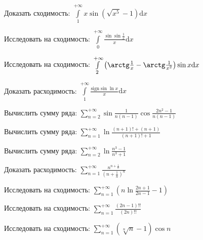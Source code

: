 \documentclass[russian]{article}
\newcommand{\dx}{\text{d}x}
\begin{document}
Доказать сходимость:
$\int\limits_1^{+\infty} x \sin (\sqrt{x^5} - 1) \dx$

Исследовать на сходимость:
$\int\limits_0^{+\infty} \frac{\sin \sin \frac{1}{x}}{x} \dx$

Исследовать на сходимость:
$\int\limits_2^{+\infty} \left( \arctg \frac{1}{x} - \arctg \frac{1}{x^2} \right) \sin x \dx$

Доказать расходимость:
$\int\limits_1^{+\infty} \frac{\text{sign} \sin \ln x}{x} \dx$


Вычислить сумму ряда:
$\sum\limits_{n = 2}^{+\infty} \sin \frac{1}{n(n-1)} \cos \frac{2n^2 - 1}{n(n - 1)}$

Вычислить сумму ряда:
$\sum\limits_{n = 1}^{+\infty}  \ln \frac{(n + 1)! + (n + 1)}{(n + 1)! + 1}$

Вычислить сумму ряда:
$\sum\limits_{n = 2}^{+\infty}  \ln \frac{n^3 - 1}{n^3 + 1}$


Доказать расходимость:
$\sum\limits_{n = 1}^{+\infty} \frac{n^{n + \frac{1}{n}}}{\left(n + \frac{1}{n}\right)^n}$

Исследовать на сходимость:
$\sum\limits_{n = 1}^{+\infty} \left(n\ln\frac{2n + 1}{2n - 1} - 1\right)$

Исследовать на сходимость:
$\sum\limits_{n = 1}^{+\infty} \frac{(2n - 1) !!}{(2n) !!}$

Исследовать на сходимость:
$\sum\limits_{n = 1}^{+\infty} (\sqrt[n]{n} - 1) \cos n$
\end{document}
